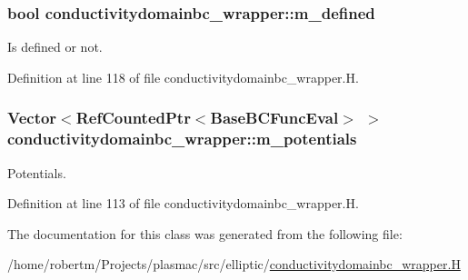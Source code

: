 \subsubsection[{\texorpdfstring{m\+\_\+defined}{m_defined}}]{\setlength{\rightskip}{0pt plus 5cm}bool conductivitydomainbc\+\_\+wrapper\+::m\+\_\+defined\hspace{0.3cm}{\ttfamily [protected]}}\hypertarget{classconductivitydomainbc__wrapper_a0836d98f7c4fe66c4f69fe428352ee96}{}\label{classconductivitydomainbc__wrapper_a0836d98f7c4fe66c4f69fe428352ee96}


Is defined or not. 



Definition at line 118 of file conductivitydomainbc\+\_\+wrapper.\+H.

\subsubsection[{\texorpdfstring{m\+\_\+potentials}{m_potentials}}]{\setlength{\rightskip}{0pt plus 5cm}Vector$<$Ref\+Counted\+Ptr$<$Base\+B\+C\+Func\+Eval$>$ $>$ conductivitydomainbc\+\_\+wrapper\+::m\+\_\+potentials\hspace{0.3cm}{\ttfamily [protected]}}\hypertarget{classconductivitydomainbc__wrapper_aba7023ba369cea86ce27d314455786ff}{}\label{classconductivitydomainbc__wrapper_aba7023ba369cea86ce27d314455786ff}


Potentials. 



Definition at line 113 of file conductivitydomainbc\+\_\+wrapper.\+H.



The documentation for this class was generated from the following file\+:\begin{DoxyCompactItemize}
\item 
/home/robertm/\+Projects/plasmac/src/elliptic/\hyperlink{conductivitydomainbc__wrapper_8H}{conductivitydomainbc\+\_\+wrapper.\+H}\end{DoxyCompactItemize}
